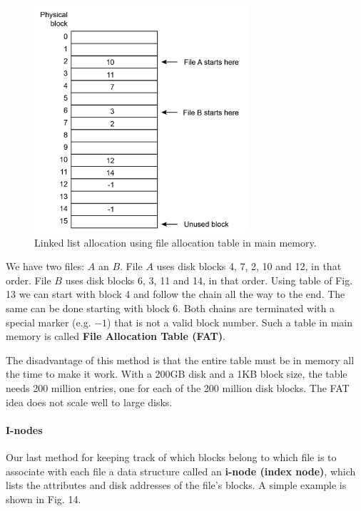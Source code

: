 \documentclass[11pt,a4paper]{article}
\begin{document}
\begin{figure}[h!]
	\centering
		\includegraphics[width=300px]{img/table-01.png}
	\caption{Linked list allocation using file allocation table in main memory.}
\end{figure}

We have two files: $A$ an $B$. File $A$ uses disk blocks 4, 7, 2, 10 and 12, in that order. File $B$ uses disk blocks 6, 3, 11 and 14, in that order. Using table of Fig. 13 we can start with block 4 and follow the chain all the way to the end. The same can be done starting with block 6. Both chains are terminated with a special marker (e.g. $-1$) that is not a valid block number. Such a table in main memory is called \textbf{File Allocation Table (FAT)}.

The disadvantage of this method is that the entire table must be in memory all the time to make it work. With a 200GB disk and a 1KB block size, the table needs 200 million entries, one for each of the 200 million disk blocks. The FAT idea does not scale well to large disks.

\paragraph{I-nodes}
Our last method for keeping track of which blocks belong to which file is to associate with each file a data structure called an \textbf{i-node (index node)}, which lists the attributes and disk addresses of the file's blocks. A simple example is shown in Fig. 14.
\end{document}
